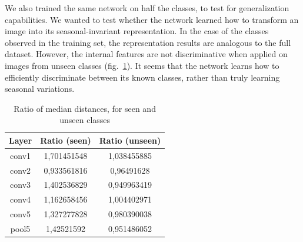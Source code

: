 We also trained the same network on half the classes, to test for generalization capabilities. We wanted to test whether the network learned how to transform an image into its seasonal-invariant representation. %
In the case of the classes observed in the training set, the representation results are analogous to the full dataset. However, the internal features are not discriminative when applied on images from unseen classes (fig.~\ref{halftrainvalues}). It seems that the network learns how to efficiently discriminate between its known classes, rather than truly learning seasonal variations.

\begin{table}[htb]
\centering
\begin{tabular}{|c|c|c|}
  \hline
   Layer & Ratio (seen) & Ratio (unseen) \\
  \hline
  conv1 & 1,701451548 & 1,038455885 \\
  conv2 & 0,933561816 & 0,96491628 \\
  conv3 & 1,402536829 & 0,949963419 \\
  conv4 & 1,162658456 & 1,004402971 \\
  conv5 & 1,327277828 & 0,980390038 \\
  pool5 & 1,42521592 & 0,951486052 \\
  \hline
\end{tabular}
\caption{Ratio of median distances, for seen and unseen classes}
\label{halftrainvalues}
\end{table}
